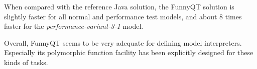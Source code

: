 \documentclass[submission]{eptcs}
\begin{document}
When compared with the reference Java solution, the FunnyQT solution is
slightly faster for all normal and performance test models, and about 8 times
faster for the \emph{performance-variant-3-1} model.

Overall, FunnyQT seems to be very adequate for defining model interpreters.
Especially its polymorphic function facility has been explicitly designed for
these kinds of tasks.




\end{document}

